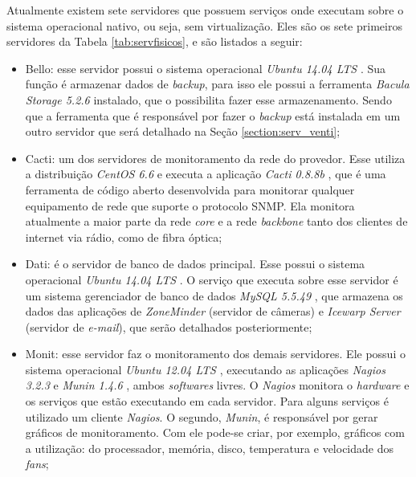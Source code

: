 Atualmente existem sete servidores que possuem serviços onde executam sobre o sistema operacional nativo, ou seja, sem virtualização. 
Eles são os sete primeiros servidores da Tabela \ref{tab:servfisicos}, e são listados a seguir:
\begin{itemize}
 \item Bello: esse servidor possui o sistema operacional \textit{Ubuntu 14.04 \ac{LTS}} \cite{ubuntu}. Sua função é armazenar dados de 
 \textit{backup}, para isso ele possui a ferramenta \textit{Bacula Storage 5.2.6} \cite{bacula} instalado, que o possibilita fazer esse 
 armazenamento. Sendo que a ferramenta que é responsável por fazer o \textit{backup} está instalada em um outro servidor que será detalhado na 
 Seção \ref{section:serv_venti};
 
 \item Cacti: um dos servidores de monitoramento da rede do provedor. Esse utiliza a distribuição \textit{CentOS 6.6} \cite{centos} e executa a 
 aplicação \textit{Cacti 0.8.8b} \cite{cacti}, que é uma ferramenta de código aberto desenvolvida para monitorar qualquer equipamento de rede que 
 suporte o protocolo \ac{SNMP}. Ela monitora atualmente a maior parte da rede \textit{core} e a rede \textit{backbone} tanto dos clientes de 
 internet via rádio, como de fibra óptica;
 
 \item Dati: é o servidor de banco de dados principal. Esse possui o sistema operacional \textit{Ubuntu 14.04 \ac{LTS}} \cite{ubuntu}. 
 O serviço que executa sobre esse servidor é um sistema gerenciador de banco de dados \textit{MySQL 5.5.49} \cite{mysql}, que armazena os dados 
 das aplicações de \textit{ZoneMinder} \cite{zoneminder} (servidor de câmeras) e \textit{Icewarp Server} (servidor de \textit{e-mail}), que serão 
 detalhados posteriormente;
 
 \item Monit: esse servidor faz o monitoramento dos demais servidores. Ele possui o sistema operacional \textit{Ubuntu 12.04 \ac{LTS}} 
 \cite{ubuntu}, executando as aplicações \textit{Nagios 3.2.3} \cite{nagios} e \textit{Munin 1.4.6} \cite{munin}, ambos \textit{softwares} livres. 
 O \textit{Nagios} monitora o \textit{hardware} e os serviços que estão executando em cada servidor. Para alguns serviços é utilizado um cliente 
 \textit{Nagios}. O segundo, \textit{Munin}, é responsável por gerar gráficos de monitoramento. Com ele pode-se criar, por exemplo, gráficos 
 com a utilização: do processador, memória, disco, temperatura e velocidade dos \textit{fans};
 

\end{itemize}
